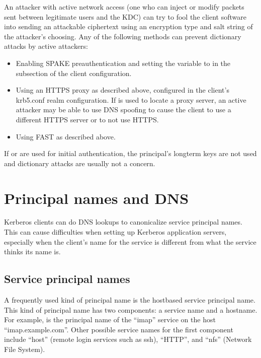 \documentclass[letterpaper,10pt,english]{sphinxmanual}
\begin{document}
\sphinxAtStartPar
An attacker with active network access (one who can inject or modify
packets sent between legitimate users and the KDC) can try to fool the
client software into sending an attackable ciphertext using an
encryption type and salt string of the attacker’s choosing.  Any of the
following methods can prevent dictionary attacks by active attackers:
\begin{itemize}
\item {} 
\sphinxAtStartPar
Enabling SPAKE preauthentication and setting the
 variable to  in the
{\hyperref[\detokenize{admin/conf_files/krb5_conf:realms}]{}} subsection of the client configuration.

\item {} 
\sphinxAtStartPar
Using an HTTPS proxy as described above, configured in the client’s
krb5.conf realm configuration.  If {\hyperref[\detokenize{admin/realm_config:kdc-discovery}]{}} is used to locate a proxy server, an active
attacker may be able to use DNS spoofing to cause the client to use
a different HTTPS server or to not use HTTPS.

\item {} 
\sphinxAtStartPar
Using FAST as described above.

\end{itemize}

\sphinxAtStartPar
If {\hyperref[\detokenize{admin/pkinit:pkinit}]{}} or {\hyperref[\detokenize{admin/otp:otp-preauth}]{}} are used for
initial authentication, the principal’s long\sphinxhyphen{}term keys are not used
and dictionary attacks are usually not a concern.


\chapter{Principal names and DNS}
\label{\detokenize{admin/princ_dns:principal-names-and-dns}}\label{\detokenize{admin/princ_dns::doc}}
\sphinxAtStartPar
Kerberos clients can do DNS lookups to canonicalize service principal
names.  This can cause difficulties when setting up Kerberos
application servers, especially when the client’s name for the service
is different from what the service thinks its name is.


\section{Service principal names}
\label{\detokenize{admin/princ_dns:service-principal-names}}
\sphinxAtStartPar
A frequently used kind of principal name is the host\sphinxhyphen{}based service
principal name.  This kind of principal name has two components: a
service name and a hostname.  For example, 
is the principal name of the “imap” service on the host
“imap.example.com”.  Other possible service names for the first
component include “host” (remote login services such as ssh), “HTTP”,
and “nfs” (Network File System).
\end{document}
